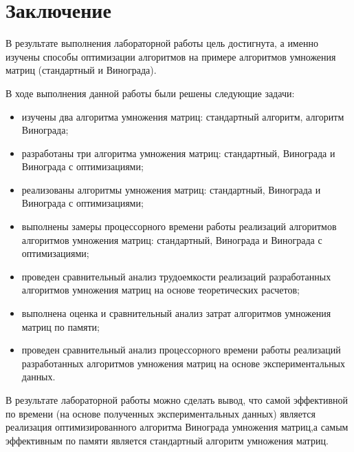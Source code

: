 \chapter*{Заключение}

В результате выполнения лабораторной работы цель достигнута, а именно изучены способы оптимизации алгоритмов на примере алгоритмов умножения матриц (стандартный и Винограда).

В ходе выполнения данной работы были решены следующие задачи:

\begin{itemize}
    \item изучены два алгоритма умножения матриц: стандартный алгоритм, алгоритм Винограда;
	\item разработаны три алгоритма умножения матриц: стандартный, Винограда и Винограда с оптимизациями;
	\item реализованы алгоритмы умножения матриц: стандартный, Винограда и Винограда с оптимизациями;
	\item выполнены замеры процессорного времени работы реализаций алгоритмов алгоритмов умножения матриц: стандартный, Винограда и Винограда с оптимизациями;
	\item проведен сравнительный анализ трудоемкости реализаций разработанных алгоритмов умножения матриц на основе теоретических расчетов;
	\item выполнена оценка и сравнительный анализ затрат алгоритмов умножения матриц по памяти; 
	\item проведен сравнительный анализ процессорного времени работы реализаций разработанных алгоритмов умножения матриц на основе экспериментальных данных.
\end{itemize}

В результате лабораторной работы можно сделать вывод, что самой эффективной по времени (на основе полученных экспериментальных данных) является реализация оптимизированного алгоритма Винограда умножения матриц,а самым эффективным по памяти является стандартный алгоритм умножения матриц.
